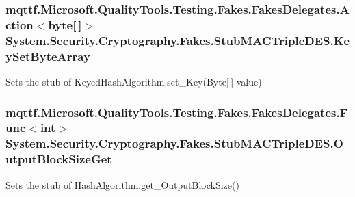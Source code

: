 \hypertarget{class_system_1_1_security_1_1_cryptography_1_1_fakes_1_1_stub_m_a_c_triple_d_e_s_a2ccaeab035d106fbc786b1c4d22ed300}{
\subsubsection[{Key\-Set\-Byte\-Array}]{\setlength{\rightskip}{0pt plus 5cm}mqttf.\-Microsoft.\-Quality\-Tools.\-Testing.\-Fakes.\-Fakes\-Delegates.\-Action$<$byte\mbox{[}$\,$\mbox{]}$>$ System.\-Security.\-Cryptography.\-Fakes.\-Stub\-M\-A\-C\-Triple\-D\-E\-S.\-Key\-Set\-Byte\-Array}}\label{class_system_1_1_security_1_1_cryptography_1_1_fakes_1_1_stub_m_a_c_triple_d_e_s_a2ccaeab035d106fbc786b1c4d22ed300}


Sets the stub of Keyed\-Hash\-Algorithm.\-set\-\_\-\-Key(\-Byte\mbox{[}$\,$\mbox{]} value)

\hypertarget{class_system_1_1_security_1_1_cryptography_1_1_fakes_1_1_stub_m_a_c_triple_d_e_s_a97a30c8872891f4e583ab445d6ac2671}{
\subsubsection[{Output\-Block\-Size\-Get}]{\setlength{\rightskip}{0pt plus 5cm}mqttf.\-Microsoft.\-Quality\-Tools.\-Testing.\-Fakes.\-Fakes\-Delegates.\-Func$<$int$>$ System.\-Security.\-Cryptography.\-Fakes.\-Stub\-M\-A\-C\-Triple\-D\-E\-S.\-Output\-Block\-Size\-Get}}\label{class_system_1_1_security_1_1_cryptography_1_1_fakes_1_1_stub_m_a_c_triple_d_e_s_a97a30c8872891f4e583ab445d6ac2671}


Sets the stub of Hash\-Algorithm.\-get\-\_\-\-Output\-Block\-Size()




